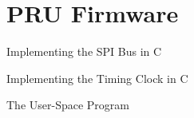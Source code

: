 \chapter{PRU Firmware}

Implementing the SPI Bus in C

Implementing the Timing Clock in C

The User-Space Program

